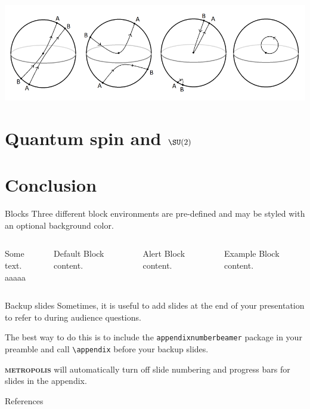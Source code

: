 \documentclass[9pt]{beamer}
\newcommand{\themename}{\textbf{\textsc{metropolis}}\xspace}
\begin{document}
\begin{frame}
\includegraphics[scale=0.1]{Pictures/4pitxistecontractibility.png}

\end{frame}

\section{Quantum spin and $\SU(2)$}

\section{Conclusion}

\begin{frame}{Blocks}
    Three different block environments are pre-defined and may be styled with an
    optional background color.
  
    \begin{columns}[T,onlytextwidth]
          
            Some text.\\[2cm]
            aaaaa
    
    
          \begin{block}{Default}
            Block content.
          \end{block}
    
          \begin{alertblock}{Alert}
            Block content.
          \end{alertblock}
    
          \begin{exampleblock}{Example}
            Block content.
          \end{exampleblock}
    
      \end{columns}

  \end{frame}

\appendix

\begin{frame}[fragile]{Backup slides}
  Sometimes, it is useful to add slides at the end of your presentation to
  refer to during audience questions.

  The best way to do this is to include the \verb|appendixnumberbeamer|
  package in your preamble and call \verb|\appendix| before your backup slides.

  \themename will automatically turn off slide numbering and progress bars for
  slides in the appendix.  \cite{ConcreteMath}
\end{frame}

\begin{frame}[allowframebreaks]{References}

  
  

\end{frame}
\end{document}
